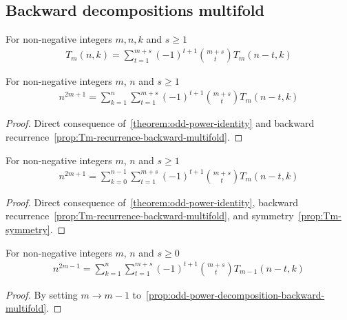\subsection{Backward decompositions multifold}
\label{subsec:backward-decompositions-multifold}
\begin{proposition}
    \label{prop:Tm-recurrence-backward-multifold}
    For non-negative integers $m,n,k$ and $s \geq 1$
    \begin{align*}
        T_{m} (n, k) = \sum_{t=1}^{m+s} (-1)^{t+1} \binom{m+s}{t} T_{m} (n-t, k)
    \end{align*}
\end{proposition}

\begin{proposition}
    \label{prop:odd-power-decomposition-backward-multifold}
    For non-negative integers $m$, $n$ and $s \geq 1$
    \begin{align*}
        n^{2m+1} = \sum_{k=1}^{n} \sum_{t=1}^{m+s} (-1)^{t+1} \binom{m+s}{t} T_{m} (n-t, k)
    \end{align*}
    \begin{proof}
        Direct consequence of~\eqref{theorem:odd-power-identity}
        and backward recurrence~\eqref{prop:Tm-recurrence-backward-multifold}.
    \end{proof}
\end{proposition}

\begin{proposition}
    \label{prop:odd-power-decomposition-backward-shifted-multifold}
    For non-negative integers $m$, $n$ and $s \geq 1$
    \begin{align*}
        n^{2m+1} = \sum_{k=0}^{n-1} \sum_{t=1}^{m+s} (-1)^{t+1} \binom{m+s}{t} T_{m} (n-t, k)
    \end{align*}
    \begin{proof}
        Direct consequence of~\eqref{theorem:odd-power-identity},
        backward recurrence~\eqref{prop:Tm-recurrence-backward-multifold},
        and symmetry~\eqref{prop:Tm-symmetry}.
    \end{proof}
\end{proposition}

\begin{corollary}
    \label{cor:odd-power-decomposition-m-1-multifold}
    For non-negative integers $m$, $n$ and $s \geq 0$
    \begin{align*}
        n^{2m-1} = \sum_{k=1}^{n} \sum_{t=1}^{m+s} (-1)^{t+1} \binom{m+s}{t} T_{m-1} (n-t, k)
    \end{align*}
    \begin{proof}
        By setting $m \rightarrow m-1$ to~\eqref{prop:odd-power-decomposition-backward-multifold}.
    \end{proof}
\end{corollary}

